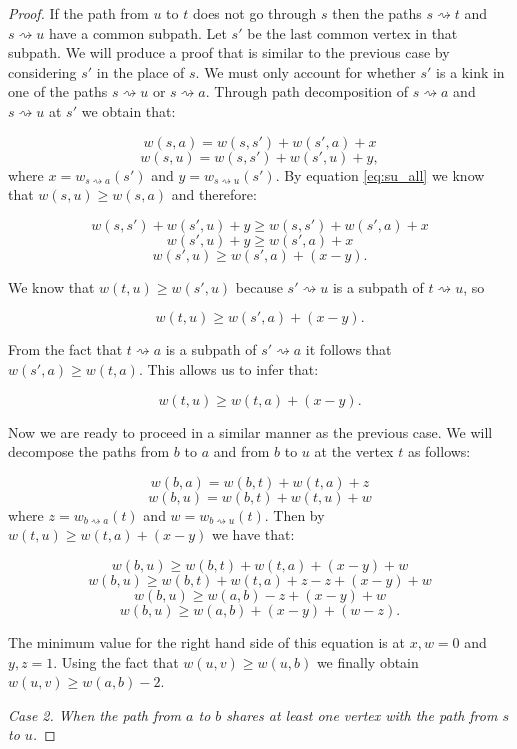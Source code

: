 \begin{proof}
If the path from $u$ to $t$ does not go through $s$ then the paths $s \rightsquigarrow t$ and $s \rightsquigarrow u$ have a common subpath. Let $s'$ be the last common vertex in that subpath. We will produce a proof that is similar to the previous case by considering $s'$ in the place of $s$. We must only account for whether $s'$ is a kink in one of the paths $s \rightsquigarrow u$ or $s \rightsquigarrow a$. Through path decomposition of $s \rightsquigarrow a$ and $s \rightsquigarrow u$ at $s'$ we obtain that:

$$ w(s, a) = w(s, s') + w(s', a) + x  $$
$$ w(s, u) = w(s, s') + w(s', u) + y, $$
where $x = w_{s \rightsquigarrow a}(s')$ and $y = w_{s \rightsquigarrow u}(s')$. By equation \ref{eq:su_all} we know that $w(s, u) \ge w(s, a)$ and therefore:

$$ w(s, s') + w(s', u) + y \ge w(s, s') + w(s', a) + x  $$
$$ w(s', u) + y \ge w(s', a) + x $$
$$ w(s', u) \ge w(s', a) + (x - y).$$

We know that $w(t, u) \ge w(s', u)$ because $s' \rightsquigarrow u$ is a subpath of $t \rightsquigarrow u$, so

$$ w(t, u) \ge w(s', a) + (x - y).$$

From the fact that $t \rightsquigarrow a$ is a subpath of $s' \rightsquigarrow a$ it follows that $w(s', a) \ge w(t, a)$. This allows us to infer that:

$$ w(t, u) \ge w(t, a) + (x - y). $$

Now we are ready to proceed in a similar manner as the previous case. We will decompose the paths from $b$ to $a$ and from $b$ to $u$ at the vertex $t$ as follows:

$$ w(b, a) = w(b, t) + w(t, a) + z  $$
$$ w(b, u) = w(b, t) + w(t, u) + w  $$
where $z = w_{b \rightsquigarrow a}(t)$ and $w = w_{b \rightsquigarrow u}(t)$. Then by $w(t, u) \ge w(t, a) + (x - y)$ we have that:

$$ w(b, u) \ge w(b, t) + w(t, a) + (x - y) + w $$
$$ w(b, u) \ge w(b, t) + w(t, a) + z - z + (x - y) + w $$
$$ w(b, u) \ge w(a, b) - z + (x - y) + w $$
$$ w(b, u) \ge w(a, b) + (x - y) + (w - z) .$$

The minimum value for the right hand side of this equation is at $x, w = 0$ and $y, z = 1$. Using the fact that $w(u, v) \ge w(u, b)$ we finally obtain $ w(u, v) \ge w(a, b) - 2 $.


{\em Case 2. When the path from $a$ to $b$ shares at least one vertex with the path from $s$ to $u$.}


\end{proof}
